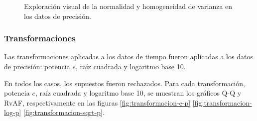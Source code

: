 \begin{figure}[H]
    \centering
    \caption{Exploración visual de la normalidad y homogeneidad de varianza en los datos de precisión.}
    \label{fig:sin-transformacion-p}
\end{figure}

\subsubsection{Transformaciones}

Las transformaciones aplicadas a los datos de tiempo fueron aplicadas a los datos de precisión: potencia $e$, raíz cuadrada y logaritmo base 10.

En todos los casos, los supuestos fueron rechazados. Para cada transformación, potencia $e$, raíz cuadrada y logaritmo base 10, se muestran los gráficos Q-Q y RvAF, respectivamente en las figuras \ref{fig:transformacion-e-p} \ref{fig:transformacion-log-p} \ref{fig:transformacion-sqrt-p}.


